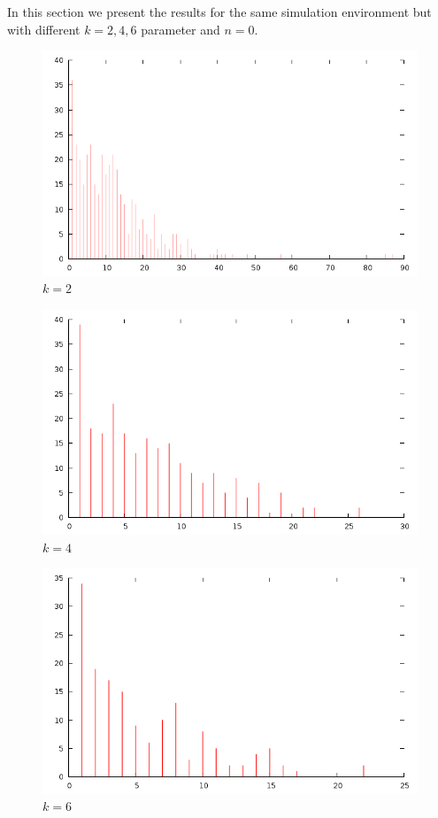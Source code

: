 \documentclass[12pt]{article}
\begin{document}
In this section we present the results for the same simulation environment but with different $k=2,4,6$ parameter and $n=0$.

\begin{figure}[H]
\centering
\caption{$k=2$}
\includegraphics[scale=0.6]{changes-n0k2.png}
\end{figure} 

\begin{figure}[H]
\centering
\caption{$k=4$}
\includegraphics[scale=0.6]{changes-n0k4.png}
\end{figure} 

\begin{figure}[H]
\centering
\caption{$k=6$}
\includegraphics[scale=0.6]{changes-n0k6.png}
\end{figure} 
\end{document}
